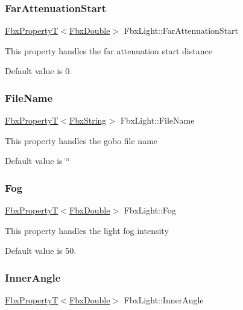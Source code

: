 \subsubsection{\texorpdfstring{Far\+Attenuation\+Start}{FarAttenuationStart}}
{\footnotesize\ttfamily \hyperlink{class_fbx_property_t}{Fbx\+PropertyT}$<$\hyperlink{fbxtypes_8h_a171e72a1c46fc15c1a6c9c31948c1c5b}{Fbx\+Double}$>$ Fbx\+Light\+::\+Far\+Attenuation\+Start}

This property handles the far attenuation start distance

Default value is 0. \mbox{\label{class_fbx_light_aeb6d0d316710f03e0f4aeb0376e1e376}} 
\subsubsection{\texorpdfstring{File\+Name}{FileName}}
{\footnotesize\ttfamily \hyperlink{class_fbx_property_t}{Fbx\+PropertyT}$<$\hyperlink{class_fbx_string}{Fbx\+String}$>$ Fbx\+Light\+::\+File\+Name}

This property handles the gobo file name

Default value is \char`\"{}\char`\"{} \mbox{\label{class_fbx_light_a85b9565571e88a5899fa7683ff77643c}} 
\subsubsection{\texorpdfstring{Fog}{Fog}}
{\footnotesize\ttfamily \hyperlink{class_fbx_property_t}{Fbx\+PropertyT}$<$\hyperlink{fbxtypes_8h_a171e72a1c46fc15c1a6c9c31948c1c5b}{Fbx\+Double}$>$ Fbx\+Light\+::\+Fog}

This property handles the light fog intensity

Default value is 50. \mbox{\label{class_fbx_light_aced336586b1b3a1b8d685bf11ef21216}} 
\subsubsection{\texorpdfstring{Inner\+Angle}{InnerAngle}}
{\footnotesize\ttfamily \hyperlink{class_fbx_property_t}{Fbx\+PropertyT}$<$\hyperlink{fbxtypes_8h_a171e72a1c46fc15c1a6c9c31948c1c5b}{Fbx\+Double}$>$ Fbx\+Light\+::\+Inner\+Angle}


